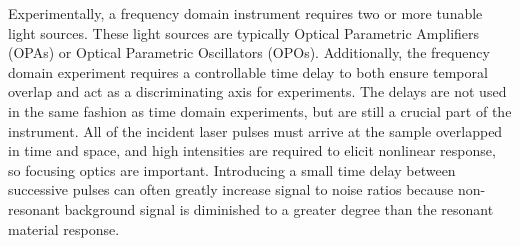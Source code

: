Experimentally, a frequency domain instrument requires two or more tunable light sources.
These light sources are typically Optical Parametric Amplifiers (OPAs) or Optical Parametric Oscillators (OPOs).
Additionally, the frequency domain experiment requires a controllable time delay to both ensure temporal overlap and act as a discriminating axis for experiments.
The delays are not used in the same fashion as time domain experiments, but are still a crucial part of the instrument.
All of the incident laser pulses must arrive at the sample overlapped in time and space, and high intensities are required to elicit nonlinear response, so focusing optics are important.
Introducing a small time delay between successive pulses can often greatly increase signal to noise ratios because non-resonant background signal is diminished to a greater degree than the resonant material response.

\clearpage
